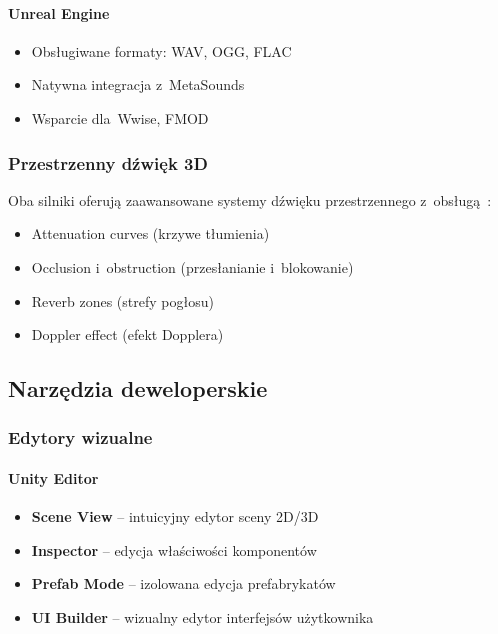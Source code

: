 \paragraph{Unreal Engine}
\begin{itemize}
    \item Obsługiwane formaty: WAV, OGG, FLAC~\cite{unreal_metasounds}
    \item Natywna integracja z~MetaSounds~\cite{unreal_metasounds}
    \item Wsparcie dla~Wwise, FMOD~\cite{firat2022sound}
\end{itemize}

\subsubsection{Przestrzenny dźwięk 3D}

Oba silniki oferują zaawansowane systemy dźwięku przestrzennego z~obsługą~\cite{firat2022sound}:
\begin{itemize}
    \item Attenuation curves (krzywe tłumienia)
    \item Occlusion i~obstruction (przesłanianie i~blokowanie)
    \item Reverb zones (strefy pogłosu)
    \item Doppler effect (efekt Dopplera)
\end{itemize}

\subsection{Narzędzia deweloperskie}

\subsubsection{Edytory wizualne}

\paragraph{Unity Editor}
\begin{itemize}
    \item \textbf{Scene View} -- intuicyjny edytor sceny 2D/3D
    \item \textbf{Inspector} -- edycja właściwości komponentów
    \item \textbf{Prefab Mode} -- izolowana edycja prefabrykatów
    \item \textbf{UI Builder} -- wizualny edytor interfejsów użytkownika
\end{itemize}

